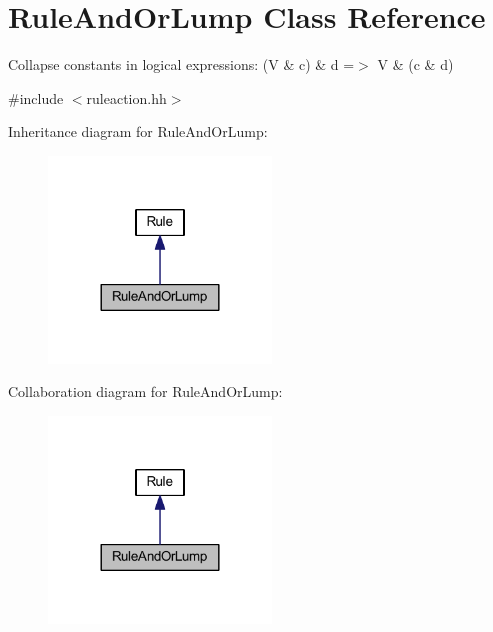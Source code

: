 \hypertarget{class_rule_and_or_lump}{}\section{Rule\+And\+Or\+Lump Class Reference}
\label{class_rule_and_or_lump}


Collapse constants in logical expressions\+: {\ttfamily (V \& c) \& d =$>$ V \& (c \& d)}  




{\ttfamily \#include $<$ruleaction.\+hh$>$}



Inheritance diagram for Rule\+And\+Or\+Lump\+:
\nopagebreak
\begin{figure}[H]
\begin{center}
\leavevmode
\includegraphics[width=168pt]{class_rule_and_or_lump__inherit__graph}
\end{center}
\end{figure}


Collaboration diagram for Rule\+And\+Or\+Lump\+:
\nopagebreak
\begin{figure}[H]
\begin{center}
\leavevmode
\includegraphics[width=168pt]{class_rule_and_or_lump__coll__graph}
\end{center}
\end{figure}
